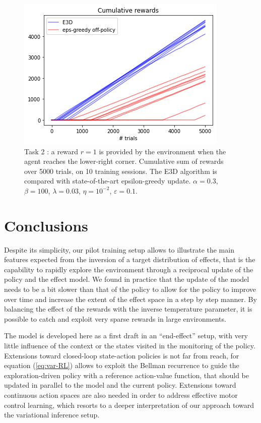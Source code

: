 \documentclass[runningheads]{llncs}
\begin{document}
\begin{figure}[t!]\label{fig:compare}

	\centerline{
		\includegraphics[width = .7\linewidth]{../figures/training-comparison.png} 		
	}
	\caption{Task 2 : a reward $r=1$ is provided by the environment when the agent reaches the lower-right corner. Cumulative sum of rewards over 5000 trials, on 10 training sessions. The E3D algorithm is compared with state-of-the-art epsilon-greedy update. $\alpha=0.3$, $\beta = 100$, $\lambda=0.03$, $\eta=10^{-2}$, $\varepsilon=0.1$.}
\end{figure}

\section{Conclusions}

Despite its simplicity, our pilot training setup allows to illustrate the main features expected from the inversion of a target distribution of effects, that is the capability to rapidly explore the environment through a reciprocal update of the policy and the effect model. We found in practice that the update of the model needs to be a bit slower than that of the policy to allow for the policy to improve over time and increase the extent of the effect space in a step by step manner. By balancing the effect of the rewards with the inverse temperature parameter, it is possible to catch and exploit very sparse rewards in large environments. 

The model is developed here as a first draft in an ``end-effect'' setup, with very little influence of the context or the states visited in the monitoring of the policy. Extensions toward closed-loop state-action policies is not far from reach, for equation (\ref{eq:var-RL}) allows to exploit the Bellman recurrence to guide the exploration-driven policy with a reference action-value function, that should be updated in parallel to the model and the current policy. Extensions toward continuous action spaces are also needed in order to address effective motor control learning, which resorts to a deeper interpretation of our approach toward the variational inference setup. 
%
%
%


%
\end{document}

